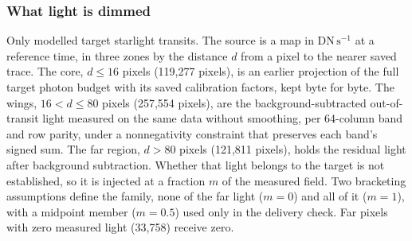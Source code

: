 \subsubsection{What light is dimmed}


Only modelled target starlight transits. The source is a map in
$\mathrm{DN\,s^{-1}}$ at a reference time, in three zones by the
distance $d$ from a pixel to the nearer saved trace. The core,
$d\leq16$ pixels (119{,}277 pixels), is an earlier projection of the full
target photon budget with its saved calibration factors, kept byte for
byte. The wings, $16<d\leq80$ pixels (257{,}554 pixels), are the
background-subtracted out-of-transit light measured on the same data
without smoothing, per 64-column band and row parity, under a
nonnegativity constraint that preserves each band's signed sum. The far
region, $d>80$ pixels (121{,}811 pixels), holds the residual light after
background subtraction. Whether that light belongs to the target is not
established, so it is injected at a fraction $m$ of the measured field.
Two bracketing assumptions define the family, none of the far light
($m=0$) and all of it ($m=1$), with a midpoint member ($m=0.5$) used only
in the delivery check. Far pixels with zero measured light (33{,}758)
receive zero.


